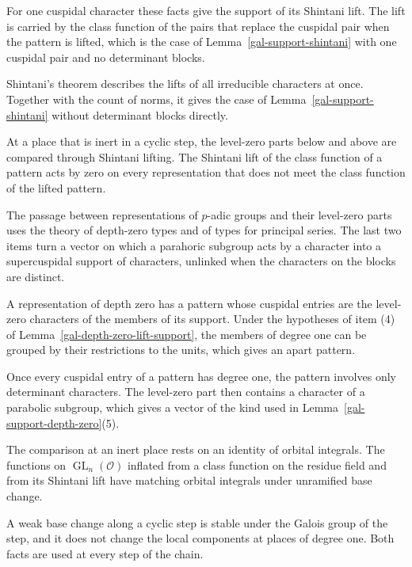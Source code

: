 For one cuspidal character these facts give the support of its Shintani lift. The lift is carried by the
class function of the pairs that replace the cuspidal pair when the pattern is lifted, which is the case of
Lemma~\ref{gal-support-shintani} with one cuspidal pair and no determinant blocks.

Shintani's theorem describes the lifts of all irreducible characters at once. Together with the count of
norms, it gives the case of Lemma~\ref{gal-support-shintani} without determinant blocks directly.

At a place that is inert in a cyclic step, the level-zero parts below and above are compared through
Shintani lifting. The Shintani lift of the class function of a pattern acts by zero on every
representation that does not meet the class function of the lifted pattern.

The passage between representations of $p$-adic groups and their level-zero parts uses the theory of
depth-zero types and of types for principal series. The last two items turn a vector on which a
parahoric subgroup acts by a character into a supercuspidal support of characters, unlinked when the
characters on the blocks are distinct.

A representation of depth zero has a pattern whose cuspidal entries are the level-zero characters of
the members of its support. Under the hypotheses of item (4) of Lemma~\ref{gal-depth-zero-lift-support},
the members of degree one can be grouped by their restrictions to the units, which gives an apart
pattern.

Once every cuspidal entry of a pattern has degree one, the pattern involves only determinant
characters. The level-zero part then contains a character of a parabolic subgroup, which gives a
vector of the kind used in Lemma~\ref{gal-support-depth-zero}(5).

The comparison at an inert place rests on an identity of orbital integrals. The functions on
$\operatorname{GL}_n(\mathcal O)$ inflated from a class function on the residue field and from its
Shintani lift have matching orbital integrals under unramified base change.

A weak base change along a cyclic step is stable under the Galois group of the step, and it does not
change the local components at places of degree one. Both facts are used at every step of the chain.

